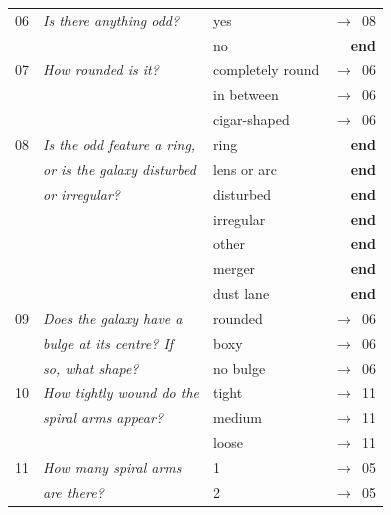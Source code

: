 \documentclass[useAMS,usenatbib]{mn2e}
\begin{document}
\begin{table}
\begin{tabular}{@{}cllr}
      \hline
06    & {\it Is there anything odd?        }  & yes              & $\rightarrow$~08 \\ 
      & {\it                               }  & no               & {\bf end}        \\
      \hline
07    & {\it How rounded is it?            }  & completely round & $\rightarrow$~06 \\
      & {\it                               }  & in between       & $\rightarrow$~06 \\
      & {\it                               }  & cigar-shaped     & $\rightarrow$~06 \\
      \hline
08    & {\it Is the odd feature a ring,    }  & ring             & {\bf end}        \\
      & {\it or is the galaxy disturbed    }  & lens or arc      & {\bf end}        \\
      & {\it or irregular?                 }  & disturbed        & {\bf end}        \\
      & {\it                               }  & irregular        & {\bf end}        \\  
      & {\it                               }  & other            & {\bf end}        \\  
      & {\it                               }  & merger           & {\bf end}        \\  
      & {\it                               }  & dust lane        & {\bf end}        \\  
      \hline
09    & {\it Does the galaxy have a        }  & rounded          & $\rightarrow$~06 \\
      & {\it bulge at its centre? If       }  & boxy             & $\rightarrow$~06 \\
      & {\it so, what shape?               }  & no bulge         & $\rightarrow$~06 \\
      \hline
10    & {\it How tightly wound do the      }  & tight            & $\rightarrow$~11 \\
      & {\it spiral arms appear?           }  & medium           & $\rightarrow$~11 \\
      & {\it                               }  & loose            & $\rightarrow$~11 \\    
      \hline
11    & {\it How many spiral arms          }  & 1                & $\rightarrow$~05 \\
      & {\it  are there?                   }  & 2                & $\rightarrow$~05 \\

\end{tabular}
\end{table}
\end{document}
